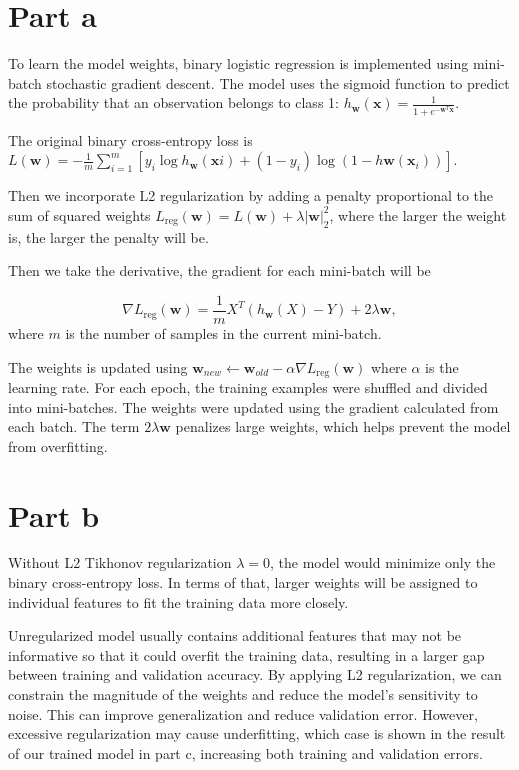 \documentclass[12pt,letterpaper]{article}
\begin{document}
\section*{Part a}

To learn the model weights, binary logistic regression is implemented using mini-batch stochastic gradient descent. The model uses the sigmoid function to predict the probability that an observation belongs to class 1: $h_{\mathbf{w}}(\mathbf{x})=\frac{1}{1+e^{-\mathbf{w}^T\mathbf{x}}}$.

The original binary cross-entropy loss is $L(\mathbf{w})=-\frac{1}{m}\sum_{i=1}^{m}\left[y_i\log h_{\mathbf{w}}(\mathbf{x}i)+(1-y_i)\log(1-h{\mathbf{w}}(\mathbf{x}_i))\right]$.

Then we incorporate L2 regularization by adding a penalty proportional to the sum of squared weights $L_{\mathrm{reg}}(\mathbf{w})=L(\mathbf{w})+\lambda|\mathbf{w}|_2^2$, where the larger the weight is, the larger the penalty will be.

Then we take the derivative, the gradient for each mini-batch will be 

\[
\nabla L_{\mathrm{reg}}(\mathbf{w})=
\frac{1}{m}X^T(h_{\mathbf{w}}(X)-Y)+2\lambda\mathbf{w},
\]
where $m$ is the number of samples in the current mini-batch.

The weights is updated using $\mathbf{w}_{new}\leftarrow\mathbf{w}_{old}-\alpha\nabla L_{\mathrm{reg}}(\mathbf{w})$ where $\alpha$ is the learning rate. For each epoch, the training examples were shuffled and divided into mini-batches. The weights were updated using the gradient calculated from each batch. The term $2\lambda\mathbf{w}$ penalizes large weights, which helps prevent the model from overfitting.


\section*{Part b}

Without L2 Tikhonov regularization $\lambda=0$, the model would minimize only the binary cross-entropy loss. In terms of that, larger weights will be assigned to individual features to fit the training data more closely.

Unregularized model usually contains additional features that may not be informative so that it could overfit the training data, resulting in a larger gap between training and validation accuracy. By applying L2 regularization, we can constrain the magnitude of the weights and reduce the model's sensitivity to noise. This can improve generalization and reduce validation error. However, excessive regularization may cause underfitting, which case is shown in the result of our trained model in part c, increasing both training and validation errors.
\end{document}

